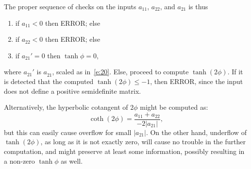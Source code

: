 \documentclass[a4paper,12pt,twoside]{article}
\begin{document}
The proper sequence of checks on the inputs $a_{11}$, $a_{22}$, and
$a_{21}$ is thus
\begin{enumerate}
\item if $a_{11}<0$ then ERROR; else
\item if $a_{22}<0$ then ERROR; else
\item if $a_{21}'=0$ then $\tanh\phi=0$,
\end{enumerate}
where $a_{21}'$ is $a_{21}^{}$, scaled as in~\eqref{e:20}.  Else,
proceed to compute $\tanh(2\phi)$.  If it is detected that the
computed $\tanh(2\phi)\le-1$, then ERROR, since the input does not
define a positive semidefinite matrix.

Alternatively, the hyperbolic cotangent of $2\phi$ might be computed
as:
\begin{equation}
  \coth(2\phi)=\frac{a_{11}+a_{22}}{-2|a_{21}|},
  \label{e:16}
\end{equation}
but this can easily cause overflow for small $|a_{21}|$.  On the other
hand, underflow of $\tanh(2\phi)$, as long as it is not exactly zero,
will cause no trouble in the further computation, and might preserve
at least some information, possibly resulting in a non-zero
$\tanh\phi$ as well.
\end{document}
